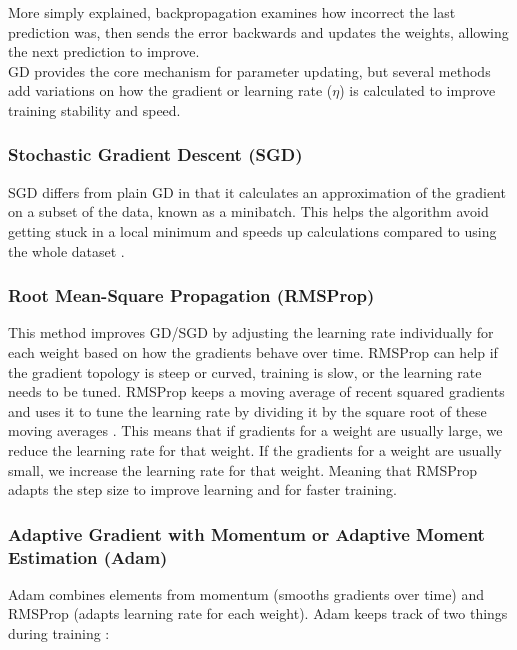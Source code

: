 \documentclass[amssymb,twocolumn,aps,floatfix]{revtex4-2}
\begin{document}
More simply explained, backpropagation examines how incorrect the last prediction was, then sends the error backwards and updates the weights, allowing the next prediction to improve. \\

GD provides the core mechanism for parameter updating, but several methods add variations on how the gradient or learning rate ($\eta$) is calculated to improve training stability and speed. 

\subsubsection{Stochastic Gradient Descent (SGD)}

SGD differs from plain GD in that it calculates an approximation of the gradient on a subset of the data, known as a minibatch. This helps the algorithm avoid getting stuck in a local minimum and speeds up calculations compared to using the whole dataset \cite{compfys_ch14} \cite{hjorthjensen_week42_misc}. 

\subsubsection{Root Mean-Square Propagation (RMSProp)}

This method improves GD/SGD by adjusting the learning rate individually for each weight based on how the gradients behave over time. RMSProp can help if the gradient topology is steep or curved, training is slow, or the learning rate needs to be tuned. RMSProp keeps a moving average of recent squared gradients and uses it to tune the learning rate by dividing it by the square root of these moving averages \cite{hjorthjensen_week42_misc} \cite{hjorthjensen_week43_misc}. This means that if gradients for a weight are usually large, we reduce the learning rate for that weight. If the gradients for a weight are usually small, we increase the learning rate for that weight. Meaning that RMSProp adapts the step size to improve learning and for faster training. 

\subsubsection{Adaptive Gradient with Momentum or Adaptive Moment Estimation (Adam)}

Adam combines elements from momentum (smooths gradients over time) and RMSProp (adapts learning rate for each weight). Adam keeps track of two things during training \cite{hjorthjensen_week41_misc}: 
\end{document}
